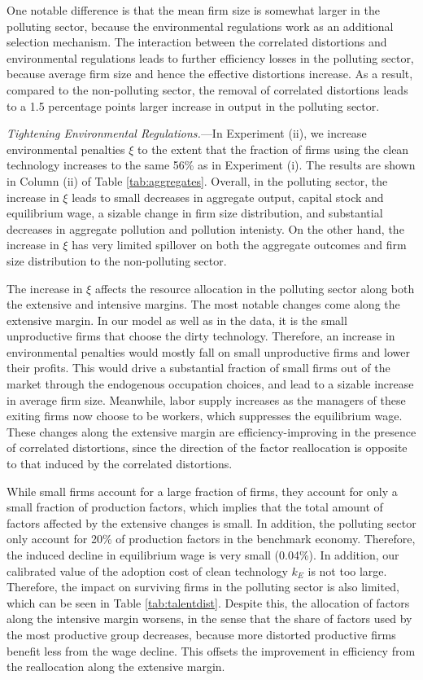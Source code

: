 \documentclass[AEJ]{AEA}
\begin{document}
One notable difference is that the mean firm size is somewhat larger in the polluting sector, because the environmental regulations work as an additional selection mechanism. The interaction between the correlated distortions and environmental regulations leads to further efficiency losses in the polluting sector, because average firm size and hence the effective distortions increase. As a result, compared to the non-polluting sector, the removal of correlated distortions leads to a 1.5 percentage points larger increase in output in the polluting sector.

\textit{Tightening Environmental Regulations.}---In Experiment (ii), we increase environmental penalties $\xi$ to the extent that the fraction of firms using the clean technology increases to the same 56\% as in Experiment (i). The results are shown in Column (ii) of Table \ref{tab:aggregates}. Overall, in the polluting sector, the increase in $\xi$ leads to small decreases in aggregate output, capital stock and equilibrium wage, a sizable change in firm size distribution, and substantial decreases in aggregate pollution and pollution intenisty. On the other hand, the increase in $\xi$ has very limited spillover on both the aggregate outcomes and firm size distribution to the non-polluting sector.

The increase in $\xi$ affects the resource allocation in the polluting sector along both the extensive and intensive margins. The most notable changes come along the extensive margin. In our model as well as in the data, it is the small unproductive firms that choose the dirty technology. Therefore, an increase in environmental penalties would mostly fall on small unproductive firms and lower their profits. This would drive a substantial fraction of small firms out of the market through the endogenous occupation choices, and lead to a sizable increase in average firm size. Meanwhile, labor supply increases as the managers of these exiting firms now choose to be workers, which suppresses the equilibrium wage. These changes along the extensive margin are efficiency-improving in the presence of correlated distortions, since the direction of the factor reallocation is opposite to that induced by the correlated distortions.

While small firms account for a large fraction of firms, they account for only a small fraction of production factors, which implies that the total amount of factors affected by the extensive changes is small. In addition, the polluting sector only account for 20\% of production factors in the benchmark economy. Therefore, the induced decline in equilibrium wage is very small (0.04\%). In addition, our calibrated value of the adoption cost of clean technology $k_E$ is not too large. Therefore, the impact on surviving firms in the polluting sector is also limited, which can be seen in Table \ref{tab:talentdist}. Despite this, the allocation of factors along the intensive margin worsens, in the sense that the share of factors used by the most productive group decreases, because more distorted productive firms benefit less from the wage decline. This offsets the improvement in efficiency from the reallocation along the extensive margin.
\end{document}

